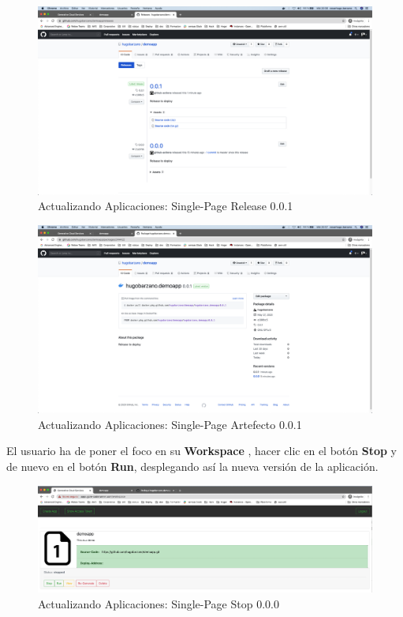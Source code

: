 \documentclass[a4paper,11pt]{book}
\begin{document}
   \begin{figure}[H]
\centering
\includegraphics[scale=0.2]{imagenes/casouso/2_8.png}
\caption{  Actualizando Aplicaciones: Single-Page Release 0.0.1  }
\end{figure}

  \begin{figure}[H]
\centering
\includegraphics[scale=0.2]{imagenes/casouso/2_9.png}
\caption{  Actualizando Aplicaciones: Single-Page Artefecto 0.0.1 }
\end{figure}
 
 El usuario ha de poner el foco en su \textbf{Workspace} , hacer clic en el botón \textbf{Stop} y de nuevo en el botón \textbf{Run}, desplegando así la nueva versión de la aplicación. 
 
   \begin{figure}[H]
\centering
\includegraphics[scale=0.25]{imagenes/casouso/2_10_a.png}
\caption{   Actualizando Aplicaciones: Single-Page Stop 0.0.0  }
\end{figure}
 
\end{document}
